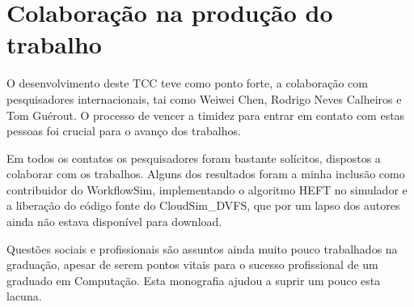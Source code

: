 \section{Colaboração na produção do trabalho} %
\label{sec:colaboracao_na_producao_do_trabalho}

O desenvolvimento deste TCC teve como ponto forte, a colaboração com
pesquisadores internacionais, tai como Weiwei Chen, Rodrigo Neves Calheiros e
Tom Guérout. O processo de vencer a timidez para entrar em contato com estas
pessoas foi crucial para o avanço dos trabalhos.

Em todos os contatos os pesquisadores foram bastante solícitos, dispostos a
colaborar com os trabalhos. Alguns dos resultados foram a minha inclusão como
contribuidor do WorkflowSim, implementando o algoritmo HEFT no simulador e a
liberação do código fonte do CloudSim\_DVFS, que por um lapso dos autores ainda
não estava disponível para download.

Questões sociais e profissionais são assuntos ainda muito pouco trabalhados na
graduação, apesar de serem pontos vitais para o sucesso profissional de um
graduado em Computação. Esta monografia ajudou a suprir um pouco esta lacuna.


